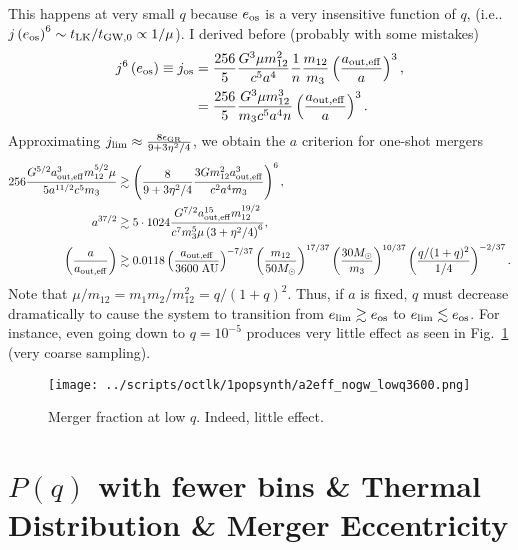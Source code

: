 \documentclass[11pt,
        usenames, %
        dvipsnames %
    ]{article}
\newcommand*{\p}[1]{\left(#1\right)}
\begin{document}
This happens at very small $q$ because $e_{\rm os}$ is a very insensitive
function of $q$, (i.e..\ $j\p{e_{\rm os}}^6 \sim t_{\rm LK} / t_{\rm GW, 0}
\propto 1/\mu$). I derived before (probably with some mistakes)
\begin{align}
    j^6\p{e_{\rm os}} \equiv j_{\rm os}
        &= \frac{256}{5}\frac{G^3 \mu m_{12}^2}{c^5a^4}
            \frac{1}{n}\frac{m_{12}}{m_3}\p{\frac{a_{\rm out,
            eff}}{a}}^3,\\
        &= \frac{256}{5}\frac{G^3 \mu m_{12}^3}{m_3c^5a^4n}
            \p{\frac{a_{\rm out, eff}}{a}}^3.
\end{align}
Approximating $j_{\lim} \approx \frac{8\epsilon_{\rm GR}}{9 + 3\eta^2/4}$, we
obtain the $a$ criterion for one-shot mergers
\begin{align}
    256 \frac{G^{5/2}a_{\rm out, eff}^3 m_{12}^{5/2}\mu}{
        5a^{11/2}c^5 m_3}
        &\gtrsim \p{\frac{8}{9 + 3\eta^2/4}
            \frac{3Gm_{12}^2a_{\rm out, eff}^3}{c^2a^4m_3}}^6,\\
    a^{37/2} &\gtrsim 5 \cdot 1024 \frac{G^{7/2}a_{\rm out, eff}^{15}
        m_{12}^{19/2}}{c^7 m_3^5 \mu \p{3 + \eta^2/4}^6},\\
    \p{\frac{a}{a_{\rm out, eff}}} &\gtrsim
        0.0118
        \p{\frac{a_{\rm out, eff}}{3600\;\mathrm{AU}}}^{-7/37}
        \p{\frac{m_{12}}{50M_{\odot}}}^{17/37}
        \p{\frac{30M_{\odot}}{m_3}}^{10/37}
        \p{\frac{q / (1 + q)^2}{1/4}}^{-2/37}.
\end{align}
Note that $\mu / m_{12} = m_1m_2 / m_{12}^2 = q / (1 + q)^2$. Thus, if $a$ is
fixed, $q$ must decrease dramatically to cause the system to transition from
$e_{\lim} \gtrsim e_{\rm os}$ to $e_{\lim} \lesssim e_{\rm os}$. For instance,
even going down to $q = 10^{-5}$ produces very little effect as seen in
Fig.~\ref{fig:lowq} (very coarse sampling).

\begin{figure}
    \centering
    \texttt{[image: ../scripts/octlk/1popsynth/a2eff\_nogw\_lowq3600.png]}
    \caption{Merger fraction at low $q$. Indeed, little effect.}\label{fig:lowq}
\end{figure}

\section{$P(q)$ with fewer bins \& Thermal Distribution \& Merger Eccentricity}
\end{document}
